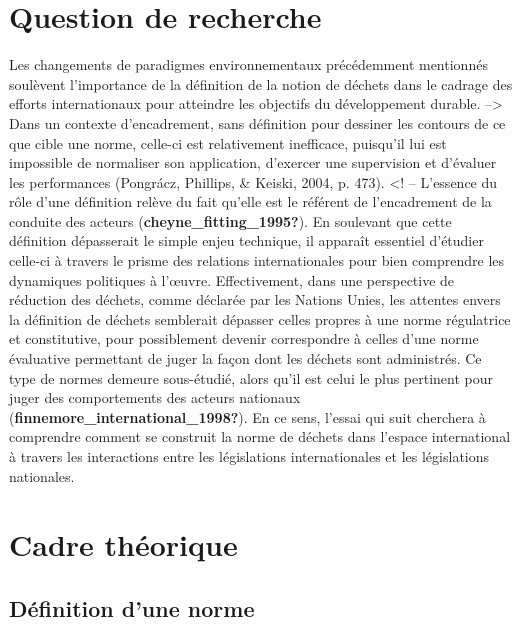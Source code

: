 \documentclass[12pt]{ulaval}
\begin{document}
\section{Question de recherche}\label{question-de-recherche}

Les changements de paradigmes environnementaux précédemment mentionnés soulèvent l'importance de la définition de la notion de déchets dans le cadrage des efforts internationaux pour atteindre les objectifs du développement durable. --\textgreater{} Dans un contexte d'encadrement, sans définition pour dessiner les contours de ce que cible une norme, celle-ci est relativement inefficace, puisqu'il lui est impossible de normaliser son application, d'exercer une supervision et d'évaluer les performances (Pongrácz, Phillips, \& Keiski, 2004, p. 473). \textless! -- L'essence du rôle d'une définition relève du fait qu'elle est le référent de l'encadrement de la conduite des acteurs (\textbf{cheyne\_fitting\_1995?}). En soulevant que cette définition dépasserait le simple enjeu technique, il apparaît essentiel d'étudier celle-ci à travers le prisme des relations internationales pour bien comprendre les dynamiques politiques à l'œuvre. Effectivement, dans une perspective de réduction des déchets, comme déclarée par les Nations Unies, les attentes envers la définition de déchets semblerait dépasser celles propres à une norme régulatrice et constitutive, pour possiblement devenir correspondre à celles d'une norme évaluative permettant de juger la façon dont les déchets sont administrés. Ce type de normes demeure sous-étudié, alors qu'il est celui le plus pertinent pour juger des comportements des acteurs nationaux (\textbf{finnemore\_international\_1998?}). En ce sens, l'essai qui suit cherchera à comprendre comment se construit la norme de déchets dans l'espace international à travers les interactions entre les législations internationales et les législations nationales.

\section{Cadre théorique}\label{cadre-thuxe9orique}

\subsection{Définition d'une norme}\label{duxe9finition-dune-norme}
\end{document}
